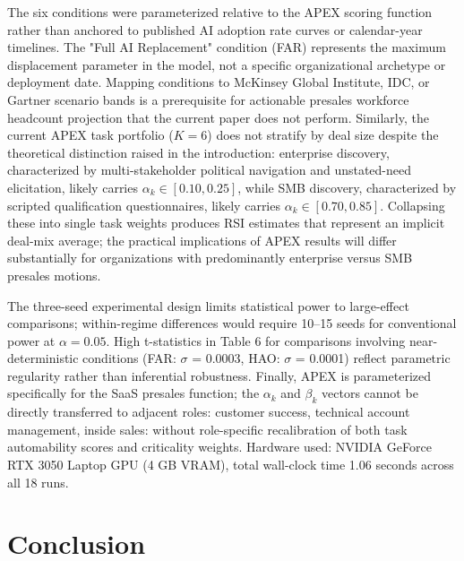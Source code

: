 \documentclass[10pt, conference]{IEEEtran}
\begin{document}
The six conditions were parameterized relative to the APEX scoring function rather than anchored to published AI adoption rate curves or calendar-year timelines. The "Full AI Replacement" condition (FAR) represents the maximum displacement parameter in the model, not a specific organizational archetype or deployment date. Mapping conditions to McKinsey Global Institute, IDC, or Gartner scenario bands is a prerequisite for actionable presales workforce headcount projection that the current paper does not perform. Similarly, the current APEX task portfolio ($K = 6$) does not stratify by deal size despite the theoretical distinction raised in the introduction: enterprise discovery, characterized by multi-stakeholder political navigation and unstated-need elicitation, likely carries $\alpha_k \in [0.10, 0.25]$, while SMB discovery, characterized by scripted qualification questionnaires, likely carries $\alpha_k \in [0.70, 0.85]$. Collapsing these into single task weights produces RSI estimates that represent an implicit deal-mix average; the practical implications of APEX results will differ substantially for organizations with predominantly enterprise versus SMB presales motions.

The three-seed experimental design limits statistical power to large-effect comparisons; within-regime differences would require 10--15 seeds for conventional power at $\alpha = 0.05$. High t-statistics in Table 6 for comparisons involving near-deterministic conditions (FAR: $\sigma$ = 0.0003, HAO: $\sigma$ = 0.0001) reflect parametric regularity rather than inferential robustness. Finally, APEX is parameterized specifically for the SaaS presales function; the $\alpha_k$ and $\beta_k$ vectors cannot be directly transferred to adjacent roles: customer success, technical account management, inside sales: without role-specific recalibration of both task automability scores and criticality weights. Hardware used: NVIDIA GeForce RTX 3050 Laptop GPU (4 GB VRAM), total wall-clock time 1.06 seconds across all 18 runs.

\section{Conclusion}

\label{sec:conclusion}
\end{document}
